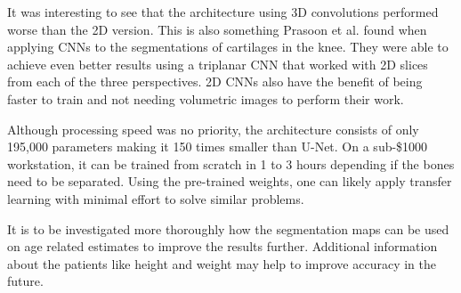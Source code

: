 \newpage

It was interesting to see that the architecture using 3D convolutions performed worse than the 2D version. This is also something Prasoon et al. \cite{Prasoon2013} found when applying CNNs to the segmentations of cartilages in the knee. They were able to achieve even better results using a triplanar CNN that worked with 2D slices from each of the three perspectives. 2D CNNs also have the benefit of being faster to train and not needing volumetric images to perform their work.

Although processing speed was no priority, the architecture consists of only 195,000 parameters making it 150 times smaller than U-Net. On a sub-\$1000 workstation, it can be trained from scratch in 1 to 3 hours depending if the bones need to be separated. Using the pre-trained weights, one can likely apply transfer learning with minimal effort to solve similar problems.

It is to be investigated more thoroughly how the segmentation maps can be used on age related estimates to improve the results further. Additional information about the patients like height and weight may help to improve accuracy in the future.

\newpage